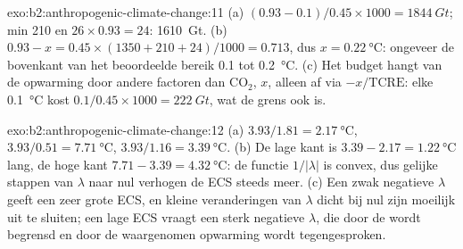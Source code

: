 \begin{solution}{exo:b2:anthropogenic-climate-change:11}
(a) $(0.93 - 0.1)/0.45 \times 1000 = \qty{1844}{Gt}$; min 210 en $26 \times 0.93 = 24$:
\qty{1610}{Gt}. (b) $0.93 - x = 0.45 \times (1350 + 210 + 24)/1000 = 0.713$, dus $x =
\qty{0.22}{\celsius}$: ongeveer de bovenkant van het beoordeelde bereik 0.1 tot \qty{0.2}{\celsius}. (c) Het
budget hangt van de opwarming door andere factoren dan CO$_2$, $x$, alleen af via $-x/\text{TCRE}$: elke
\qty{0.1}{\celsius} kost $0.1/0.45 \times 1000 = \qty{222}{Gt}$, wat de grens ook is.
\end{solution}

\begin{solution}{exo:b2:anthropogenic-climate-change:12}
(a) $3.93/1.81 = \qty{2.17}{\celsius}$, $3.93/0.51 = \qty{7.71}{\celsius}$, $3.93/1.16 =
\qty{3.39}{\celsius}$. (b) De lage kant is $3.39 - 2.17 = \qty{1.22}{\celsius}$ lang, de hoge kant
$7.71 - 3.39 = \qty{4.32}{\celsius}$: de functie $1/|\lambda|$ is convex, dus gelijke stappen van
$\lambda$ naar nul verhogen de ECS steeds meer. (c) Een zwak negatieve $\lambda$ geeft een zeer
grote ECS, en kleine veranderingen van $\lambda$ dicht bij nul zijn moeilijk uit te sluiten; een lage ECS vraagt een sterk
negatieve $\lambda$, die door de  wordt begrensd en door de waargenomen opwarming wordt tegengesproken.
\end{solution}

